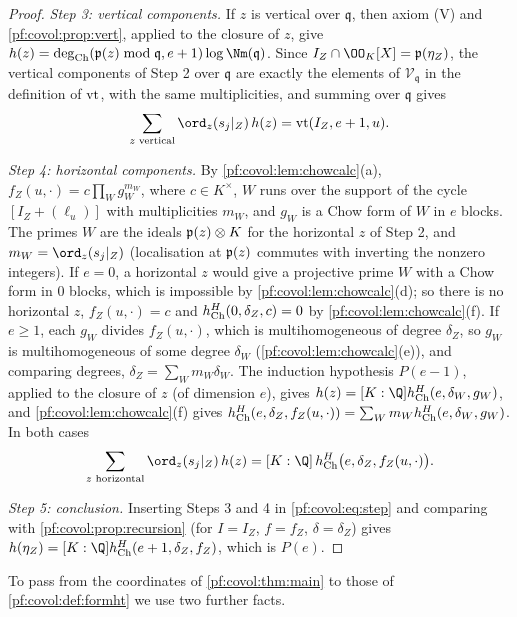 \begin{proof}
\emph{Step 3: vertical components.} If $z$ is vertical over $\mathfrak q$, then axiom (V) and
\cref{pf:covol:prop:vert}, applied to the closure of $z$, give $h(z)=\covolCdeg(\covolPt(z)\bmod
\mathfrak q,e+1)\log\Nm(\mathfrak q)$. Since $I_Z\cap\OO_K[X]=\covolPt(\eta_Z)$, the vertical components
of Step 2 over $\mathfrak q$ are exactly the elements of $\mathcal V_{\mathfrak q}$ in the definition of
$\operatorname{vt}$, with the same multiplicities, and summing over $\mathfrak q$ gives
\[
\sum_{z\text{ vertical}}\ord_z(s_j|_Z)\,h(z)=\covolVt(I_Z,e+1,u).
\]

\emph{Step 4: horizontal components.} By \cref{pf:covol:lem:chowcalc}(a), $f_Z(u,\cdot)=c\prod_W
g_W^{m_W}$, where $c\in K^\times$, $W$ runs over the support of the cycle $[I_Z+(\ell_u)]$ with
multiplicities $m_W$, and $g_W$ is a Chow form of $W$ in $e$ blocks. The primes $W$ are the ideals
$\mathfrak{p}(z)\otimes K$ for the horizontal $z$ of Step 2, and $m_W=\ord_z(s_j|_Z)$ (localisation at
$\mathfrak{p}(z)$ commutes with inverting the nonzero integers). If $e=0$, a horizontal $z$ would give a
projective prime $W$ with a Chow form in $0$ blocks, which is impossible by
\cref{pf:covol:lem:chowcalc}(d); so there is no horizontal $z$, $f_Z(u,\cdot)=c$ and
$h_{\mathrm{Ch}}^H(0,\delta_Z,c)=0$ by \cref{pf:covol:lem:chowcalc}(f). If $e\ge1$, each $g_W$ divides
$f_Z(u,\cdot)$, which is multihomogeneous of degree $\delta_Z$, so $g_W$ is multihomogeneous of some
degree $\delta_W$ (\cref{pf:covol:lem:chowcalc}(e)), and comparing degrees, $\delta_Z=\sum_Wm_W\delta_W$.
The induction hypothesis $P(e-1)$, applied to the closure of $z$ (of dimension $e$), gives
$h(z)=[K:\Q]\covolHch^H(e,\delta_W,g_W)$, and \cref{pf:covol:lem:chowcalc}(f) gives
$h_{\mathrm{Ch}}^H(e,\delta_Z,f_Z(u,\cdot))=\sum_Wm_Wh_{\mathrm{Ch}}^H(e,\delta_W,g_W)$. In both cases
\[
\sum_{z\text{ horizontal}}\ord_z(s_j|_Z)\,h(z)=[K:\Q]\,\covolHch^H\bigl(e,\delta_Z,f_Z(u,\cdot)\bigr).
\]

\emph{Step 5: conclusion.} Inserting Steps 3 and 4 in \eqref{pf:covol:eq:step} and comparing with
\cref{pf:covol:prop:recursion} (for $I=I_Z$, $f=f_Z$, $\delta=\delta_Z$) gives
$h(\eta_Z)=[K:\Q]\covolHch^H(e+1,\delta_Z,f_Z)$, which is $P(e)$.
\end{proof}

To pass from the coordinates of \cref{pf:covol:thm:main} to those of \cref{pf:covol:def:formht} we use two
further facts.

